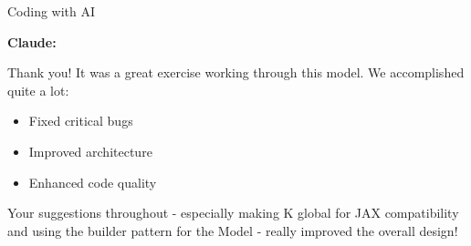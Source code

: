 \begin{frame}{Coding with AI}
    
    \begin{figure}
       \centering
    \end{figure}

\end{frame}


\begin{frame}
    
    \begin{figure}
       \centering
    \end{figure}

\end{frame}


\begin{frame}

    \textbf{Claude:}

    \medskip
    
  Thank you! It was a great exercise working through this model. We accomplished quite a lot:

  \begin{itemize}
      \item Fixed critical bugs 
      \item Improved architecture 
      \item Enhanced code quality 
  \end{itemize}

  Your suggestions throughout - especially making K global for JAX compatibility
  and using the builder pattern for the Model - really improved the overall design!

\end{frame}


